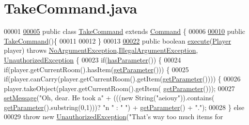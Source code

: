 \hypertarget{TakeCommand_8java_source}{\section{Take\-Command.\-java}
}

\begin{DoxyCode}
00001 
\hypertarget{TakeCommand_8java_source_l00005}{}\hyperlink{classTakeCommand}{00005} \textcolor{keyword}{public} \textcolor{keyword}{class }\hyperlink{classTakeCommand}{TakeCommand} \textcolor{keyword}{extends} \hyperlink{classCommand}{Command} \{
00006 
\hypertarget{TakeCommand_8java_source_l00010}{}\hyperlink{classTakeCommand_a99adf41b921a59fe81700461cbba59a8}{00010}     \textcolor{keyword}{public} \hyperlink{classTakeCommand_a99adf41b921a59fe81700461cbba59a8}{TakeCommand}()\{
00011 
00012     \}
00013 
\hypertarget{TakeCommand_8java_source_l00022}{}\hyperlink{classTakeCommand_af316002e14bb3253d24bcb03282213ee}{00022}     \textcolor{keyword}{public} \textcolor{keywordtype}{boolean} \hyperlink{classTakeCommand_af316002e14bb3253d24bcb03282213ee}{execute}(\hyperlink{classPlayer}{Player} player) \textcolor{keywordflow}{throws} 
      \hyperlink{classNoArgumentException}{NoArgumentException},\hyperlink{classIllegalArgumentException}{IllegalArgumentException},
      \hyperlink{classUnauthorizedException}{UnauthorizedException} \{
00023         \textcolor{keywordflow}{if}(\hyperlink{classCommand_a9b042558156d6749566e0fd9d48d3bfe}{hasParameter}()) \{
00024             \textcolor{keywordflow}{if}(player.getCurrentRoom().hasItem(\hyperlink{classCommand_a1ced3739d546770ba1389e6ce228255e}{getParameter}())) \{
00025                 \textcolor{keywordflow}{if}(player.canCarry(player.getCurrentRoom().getItem(\hyperlink{classCommand_a1ced3739d546770ba1389e6ce228255e}{getParameter}()))) \{
00026                     player.takeObject(player.getCurrentRoom().getItem(
      \hyperlink{classCommand_a1ced3739d546770ba1389e6ce228255e}{getParameter}()));
00027                     \hyperlink{classCommand_a715709d8f0ab65879d79ad1725c96f17}{setMessage}(\textcolor{stringliteral}{"Oh, dear. He took a"} + (((\textcolor{keyword}{new} String(\textcolor{stringliteral}{"aeiouy"})).contains(
      \hyperlink{classCommand_a1ced3739d546770ba1389e6ce228255e}{getParameter}().substring(0,1)))? \textcolor{stringliteral}{"n "} : \textcolor{stringliteral}{" "}) + \hyperlink{classCommand_a1ced3739d546770ba1389e6ce228255e}{getParameter}() + \textcolor{stringliteral}{"."});
00028                 \} \textcolor{keywordflow}{else}
00029                     \textcolor{keywordflow}{throw} \textcolor{keyword}{new} \hyperlink{classUnauthorizedException}{UnauthorizedException}(\textcolor{stringliteral}{"That's way too much items for
}
\end{DoxyCode}
